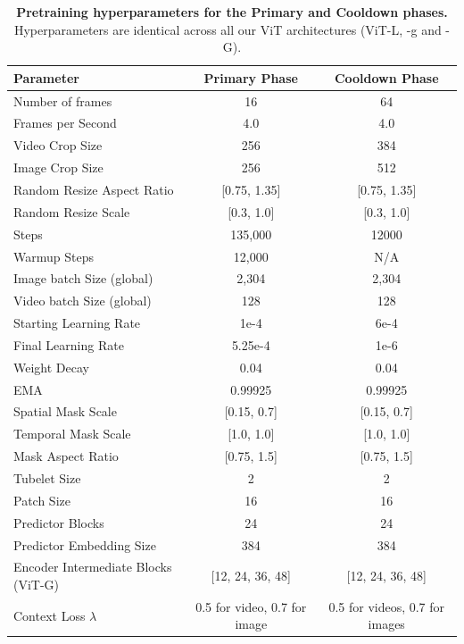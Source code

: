 \documentclass[]{fairmeta}
\begin{document}
\begin{table}
\centering
\caption{\textbf{Pretraining hyperparameters for the Primary and Cooldown phases.} Hyperparameters are identical across all our ViT architectures (ViT-L, -g and -G).}
\begin{tabular}{lcc}
\toprule
\textbf{Parameter} & \textbf{Primary Phase} & \textbf{Cooldown Phase} \\
\midrule
Number of frames               & 16                      & 64                      \\
Frames per Second             & 4.0                     & 4.0                     \\
Video Crop Size& 256                     & 384\\
 Image Crop Size& 256&512\\
Random Resize Aspect Ratio    & [0.75, 1.35]            & [0.75, 1.35]            \\
Random Resize Scale           & [0.3, 1.0]              & [0.3, 1.0]              \\
Steps                         & 135,000& 12000                   \\
Warmup Steps                  & 12,000& N/A                     \\
Image batch Size (global)& 2,304& 2,304\\
Video batch Size (global)& 128&128\\
Starting Learning Rate        & 1e-4                    & 6e-4\\
Final Learning Rate           & 5.25e-4                 & 1e-6                    \\
Weight Decay                  & 0.04                    & 0.04                    \\
EMA                           & 0.99925                 & 0.99925                 \\
Spatial Mask Scale            & [0.15, 0.7]             & [0.15, 0.7]             \\
Temporal Mask Scale           & [1.0, 1.0]              & [1.0, 1.0]              \\
Mask Aspect Ratio             & [0.75, 1.5]             & [0.75, 1.5]             \\
Tubelet Size                  & 2                       & 2                       \\
Patch Size                    & 16                      & 16                      \\
Predictor Blocks              & 24                      & 24                      \\
Predictor Embedding Size      & 384                     & 384                      \\
Encoder Intermediate Blocks (ViT-G)   & [12, 24, 36, 48]        & [12, 24, 36, 48]         \\
Context Loss $\lambda$   & 0.5 for video, 0.7 for image        & 0.5 for videos, 0.7 for images        \\
\bottomrule
\end{tabular}
\vspace{5mm}
\label{tab:training_phases}
\end{table}
\end{document}
